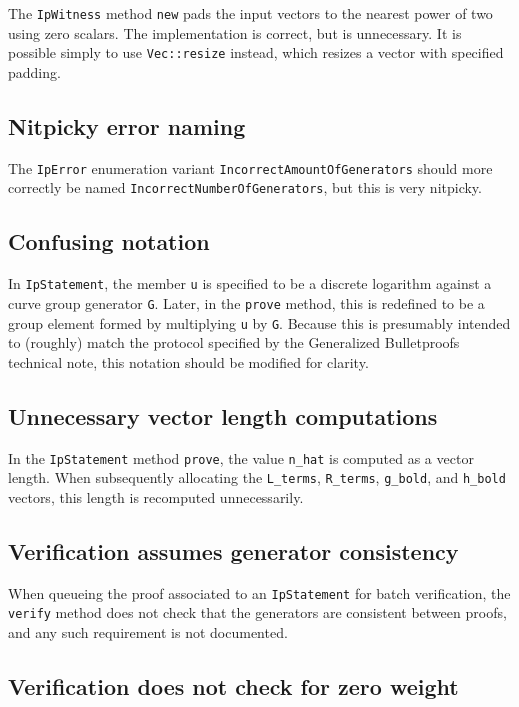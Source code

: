 \documentclass{article}
\begin{document}
The \texttt{IpWitness} method \texttt{new} pads the input vectors to the nearest power of two using zero scalars.
The implementation is correct, but is unnecessary.
It is possible simply to use \texttt{Vec::resize} instead, which resizes a vector with specified padding.


\subsection{Nitpicky error naming}

The \texttt{IpError} enumeration variant \texttt{IncorrectAmountOfGenerators} should more correctly be named \texttt{IncorrectNumberOfGenerators}, but this is very nitpicky.


\subsection{Confusing notation}

In \texttt{IpStatement}, the member \texttt{u} is specified to be a discrete logarithm against a curve group generator \texttt{G}.
Later, in the \texttt{prove} method, this is redefined to be a group element formed by multiplying \texttt{u} by \texttt{G}.
Because this is presumably intended to (roughly) match the protocol specified by the Generalized Bulletproofs technical note, this notation should be modified for clarity.


\subsection{Unnecessary vector length computations}

In the \texttt{IpStatement} method \texttt{prove}, the value \texttt{n\_hat} is computed as a vector length.
When subsequently allocating the \texttt{L\_terms}, \texttt{R\_terms}, \texttt{g\_bold}, and \texttt{h\_bold} vectors, this length is recomputed unnecessarily.


\subsection{Verification assumes generator consistency}

When queueing the proof associated to an \texttt{IpStatement} for batch verification, the \texttt{verify} method does not check that the generators are consistent between proofs, and any such requirement is not documented.


\subsection{Verification does not check for zero weight}
\end{document}
